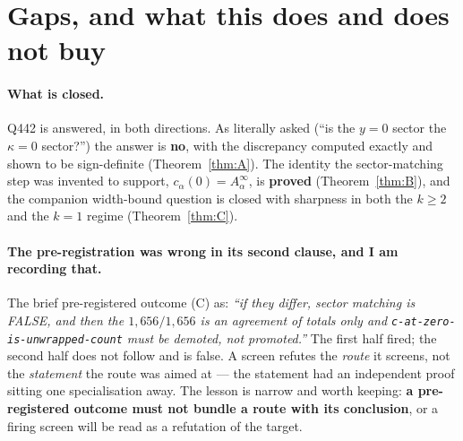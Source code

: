 \documentclass[11pt]{article}
\theoremstyle{plain}
\theoremstyle{definition}
\begin{document}
\section{Gaps, and what this does and does not buy}\label{sec:gaps}

\paragraph{What is closed.}  Q442 is answered, in both directions.  As literally asked
(``is the $y=0$ sector the $\kappa=0$ sector?'') the answer is \textbf{no}, with the
discrepancy computed exactly and shown to be sign-definite (Theorem~\ref{thm:A}).  The
identity the sector-matching step was invented to support, $c_\alpha(0)=A^\infty_\alpha$,
is \textbf{proved} (Theorem~\ref{thm:B}), and the companion width-bound question is closed
with sharpness in both the $k\ge2$ and the $k=1$ regime (Theorem~\ref{thm:C}).

\paragraph{The pre-registration was wrong in its second clause, and I am recording that.}
The brief pre-registered outcome (C) as: \emph{``if they differ, sector matching is FALSE,
and then the $1{,}656/1{,}656$ is an agreement of totals only and
\texttt{c-at-zero-is-unwrapped-count} must be demoted, not promoted.''}  The first half
fired; the second half does not follow and is false.  A screen refutes the \emph{route} it
screens, not the \emph{statement} the route was aimed at --- the statement had an
independent proof sitting one specialisation away.  The lesson is narrow and worth keeping:
\textbf{a pre-registered outcome must not bundle a route with its conclusion}, or a firing
screen will be read as a refutation of the target.
\end{document}
